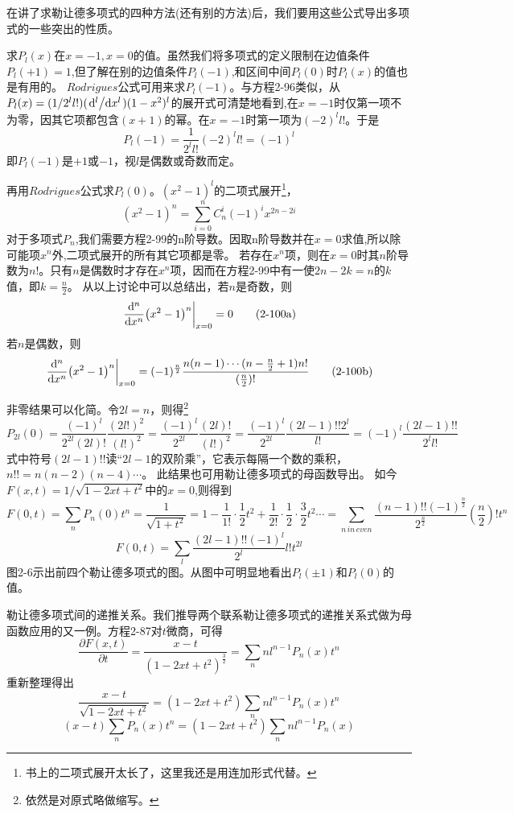 在讲了求勒让德多项式的四种方法(还有别的方法)后，我们要用这些公式导出多项式的一些突出的性质。

求$P_l(x)$在$x=-1,x=0$的值。虽然我们将多项式的定义限制在边值条件$P_l(+1)=1$,但了解在别的边值条件$P_l(-1)$,和区间中间$P_l(0)$时$P_l(x)$的值也是有用的。
$Rodrigues$公式可用来求$P_l(-1)$。与方程2-96类似，从$P_l(x)=(1/2^ll!)(\dv*[l]{x})(1-x^2)^l$的展开式可清楚地看到,在$x=-1$时仅第一项不为零，因其它项都包含$(x+1)$的幂。在$x=-1$时第一项为$(-2)^ll!$。于是
\[P_l(-1)=\frac{1}{2^ll!}(-2)^ll!=(-1)^l \tag{2-98}\]
即$P_l(-1)$是$+1$或$-1$，视$l$是偶数或奇数而定。

再用$Rodrigues$公式求$P_l(0)$。$(x^2-1)^l$的二项式展开\footnote{书上的二项式展开太长了，这里我还是用连加形式代替。}，
\[(x^2-1)^n=\sum_{i=0}^nC_n^i(-1)^ix^{2n-2i} \tag{2-99}\]
对于多项式$P_n$,我们需要方程2-99的n阶导数。因取n阶导数并在$x=0$求值,所以除可能项$x^n$外,二项式展开的所有其它项都是零。
若存在$x^n$项，则在$x=0$时其$n$阶导数为$n!$。只有$n$是偶数时才存在$x^n$项，因而在方程2-99中有一使$2n-2k=n$的$k$值，即$k=\frac{n}{2}$。
从以上讨论中可以总结出，若$n$是奇数，则
\[\eval{\dv[n]{x}(x^2-1)^n}_{x=0}=0 \tag{2-100a}\]
若$n$是偶数，则
\[\eval{\dv[n]{x}(x^2-1)^n}_{x=0}=(-1)^{\frac{n}{2}}\frac{n(n-1)\cdots(n-\frac{n}{2}+1)n!}{(\frac{n}{2})!} \tag{2-100b}\]

非零结果可以化简。令$2l=n$，则得\footnote{依然是对原式略做缩写。}
\[P_{2l}(0)=\frac{(-1)^l}{2^{2l}(2l)!}\frac{(2l!)^2}{(l!)^2}=\frac{(-1)^l}{2^{2l}}\frac{(2l)!}{(l!)^2}=\frac{(-1)^l}{2^{2l}}\frac{(2l-1)!!2^l}{l!}=(-1)^l\frac{(2l-1)!!}{2^ll!} \tag{2-101}\]
式中符号$(2l-1)!!$读“$2l-1$的双阶乘”，它表示每隔一个数的乘积，$n!!=n(n-2)(n-4)\cdots$。 此结果也可用勒让德多项式的母函数导出。
如今$F(x,t)=1/\sqrt{1-2xt+t^2}$中的$x=0$,则得到
\[F(0,t)=\sum_nP_n(0)t^n=\frac{1}{\sqrt{1+t^2}}=1-\frac{1}{1!} \cdot \frac{1}{2}t^2+\frac{1}{2!} \cdot \frac{1}{2} \cdot \frac{3}{2}t^2 \cdots =\sum_{n \, in \, even}\frac{(n-1)!!(-1)^{\frac{n}{2}}}{2^{\frac{n}{2}}}\left(\frac{n}{2}\right)!t^n\]
\[F(0,t)=\sum_l\frac{(2l-1)!!(-1)^l}{2^l}l!t^{2l} \tag{2-102}\]
图2-6示出前四个勒让德多项式的图。从图中可明显地看出$P_l( \pm 1)$和$P_l(0)$的值。

勒让德多项式间的递推关系。我们推导两个联系勒让德多项式的递推关系式做为母函数应用的又一例。方程2-87对$t$微商，可得
\[\frac{\partial F(x,t)}{\partial t}=\frac{x-t}{(1-2xt+t^2)^{\frac{3}{2}}}=\sum_nnl^{n-1}P_n(x)t^n \tag{2-103}\]
重新整理得出
\[\frac{x-t}{\sqrt{1-2xt+t^2}}=(1-2xt+t^2)\sum_nnl^{n-1}P_n(x)t^n\]
\[(x-t)\sum_nP_n(x)t^n=(1-2xt+t^2)\sum_nnl^{n-1}P_n(x) \tag{2-104}\]

